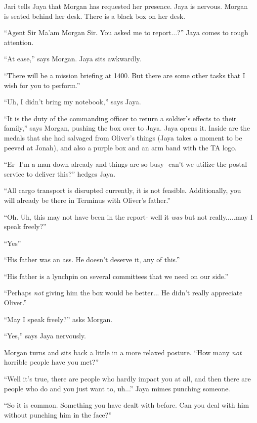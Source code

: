 
Jari tells Jaya that Morgan has requested her presence.  Jaya is nervous.  Morgan is seated behind her desk.  There is a black box on her desk.  

``Agent Sir Ma'am Morgan Sir.  You asked me to report...?'' Jaya comes to rough attention.

``At ease,'' says Morgan.  Jaya sits awkwardly.

``There will be a mission briefing at 1400.  But there are some other tasks that I wish for you to perform.''

``Uh, I didn't bring my notebook,'' says Jaya.

``It is the duty of the commanding officer to return a soldier's effects to their family,'' says Morgan, pushing the box over to Jaya.  Jaya opens it.  Inside are the medals that she had salvaged from Oliver's things (Jaya takes a moment to be peeved at Jonah), and also a purple box and an arm band with the TA logo.

``Er- I'm a man down already and things are so busy- can't we utilize the postal service to deliver this?'' hedges Jaya.

``All cargo transport is disrupted currently, it is not feasible.  Additionally, you will already be there in Terminus with Oliver's father.''

``Oh.  Uh, this may not have been in the report- well it \textit{was} but not really.....may I speak freely?''

``Yes''

``His father was an ass.  He doesn't deserve it, any of this.''

``His father is a lynchpin on several committees that we need on our side.''

``Perhaps \textit{not} giving him the box would be better... He didn't really appreciate Oliver.''

``May I speak freely?'' asks Morgan.

``Yes,'' says Jaya nervously.

Morgan turns and sits back a little in a more relaxed posture.  ``How many \textit{not} horrible people have you met?''

``Well it's true, there are people who hardly impact you at all, and then there are people who do and you just want to, uh...'' Jaya mimes punching someone.

``So it is common.  Something you have dealt with before.  Can you deal with him without punching him in the face?''

